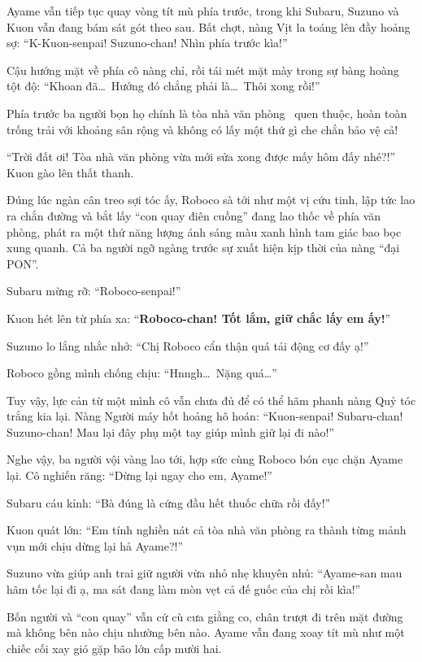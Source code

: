 \documentclass[../main.tex]{subfiles}
\begin{document}
Ayame vẫn tiếp tục quay vòng tít mù phía trước, trong khi Subaru, Suzuno và Kuon vẫn đang bám sát gót theo sau. Bất chợt, nàng Vịt la toáng lên đầy hoảng sợ: ``K-Kuon-senpai! Suzuno-chan! Nhìn phía trước kìa!''

Cậu hướng mặt về phía cô nàng chỉ, rồi tái mét mặt mày trong sự bàng hoàng tột độ: ``Khoan đã\dots\ Hướng đó chẳng phải là\dots\ Thôi xong rồi!''

Phía trước ba người bọn họ chính là tòa nhà văn phòng \hll\ quen thuộc, hoàn toàn trống trải với khoảng sân rộng và không có lấy một thứ gì che chắn bảo vệ cả!

``Trời đất ơi! Tòa nhà văn phòng vừa mới sửa xong được mấy hôm đấy nhé?!'' Kuon gào lên thất thanh.

Đúng lúc ngàn cân treo sợi tóc ấy, Roboco sà tới như một vị cứu tinh, lập tức lao ra chắn đường và bắt lấy ``con quay điên cuồng'' đang lao thốc về phía văn phòng, phát ra một thứ năng lượng ánh sáng màu xanh hình tam giác bao bọc xung quanh. Cả ba người ngỡ ngàng trước sự xuất hiện kịp thời của nàng ``đại PON''.


Subaru mừng rỡ: ``Roboco-senpai!''

Kuon hét lên từ phía xa: ``\textbf{Roboco-chan! Tốt lắm, giữ chắc lấy em ấy!}''

Suzuno lo lắng nhắc nhở: ``Chị Roboco cẩn thận quá tải động cơ đấy ạ!''

Roboco gồng mình chống chịu: ``Hnngh\dots\ Nặng quá\dots''

Tuy vậy, lực cản từ một mình cô vẫn chưa đủ để có thể hãm phanh nàng Quỷ tóc trắng kia lại. Nàng Người máy hốt hoảng hô hoán: ``Kuon-senpai! Subaru-chan! Suzuno-chan! Mau lại đây phụ một tay giúp mình giữ lại đi nào!''

Nghe vậy, ba người vội vàng lao tới, hợp sức cùng Roboco bón cục chặn Ayame lại. Cô nghiến răng: ``Dừng lại ngay cho em, Ayame!''

Subaru cáu kỉnh: ``Bà đúng là cứng đầu hết thuốc chữa rồi đấy!''

Kuon quát lớn: ``Em tính nghiền nát cả tòa nhà văn phòng ra thành từng mảnh vụn mới chịu dừng lại hả Ayame?!''

Suzuno vừa giúp anh trai giữ người vừa nhỏ nhẹ khuyên nhủ: ``Ayame-san mau hãm tốc lại đi ạ, ma sát đang làm mòn vẹt cả đế guốc của chị rồi kìa!''

Bốn người và ``con quay'' vẫn cứ cù cưa giằng co, chân trượt đi trên mặt đường mà không bên nào chịu nhường bên nào. Ayame vẫn đang xoay tít mù như một chiếc cối xay gió gặp bão lớn cấp mười hai.
\end{document}

